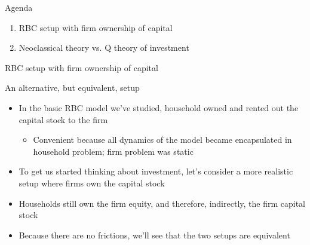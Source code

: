 \documentclass[9pt,xcolor={dvipsnames}]{beamer}
\newcommand{\bit}{\begin{itemize}}
\newcommand{\eit}{\end{itemize}}
\newcommand{\ben}{\begin{enumerate}}
\newcommand{\een}{\end{enumerate}}
\begin{document}
%
%
%
%
%
%
%
%
%
%
%
%
%


\begin{frame}{Agenda}

\ben
\setlength\itemsep{1.5em} 

\item RBC setup with firm ownership of capital

\item Neoclassical theory vs. Q theory of investment

\een

\end{frame}

\begin{frame}

\begin{center}
	\huge RBC setup with firm ownership of capital \normalfont
\end{center}

\end{frame}

\begin{frame}{An alternative, but equivalent, setup}

\bit
\setlength\itemsep{1.5em} 

\item In the basic RBC model we've studied, household owned and rented out the capital stock to the firm
\bit
	\item Convenient because all dynamics of the model became encapsulated in household problem; firm problem was static
\eit

\item To get us started thinking about investment, let's consider a more realistic setup where firms own the capital stock

\item Households still own the firm equity, and therefore, indirectly, the firm capital stock

\item Because there are no frictions, we'll see that the two setups are equivalent
\eit

\end{frame}
\end{document}

